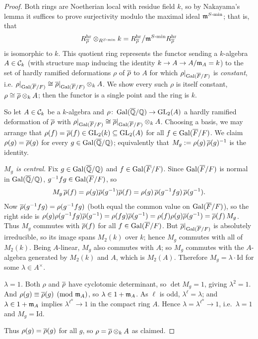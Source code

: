 \documentclass[11pt]{article}
\begin{document}
\begin{proof}
Both rings are Noetherian local with residue field $k$, so by Nakayama's lemma
it suffices to prove surjectivity modulo the maximal ideal
$\mathfrak{m}^{S\text{-}\mathrm{min}}$; that is, that
\[
  R^{\mathrm{hr}}_{\overline{\rho}}\otimes_{R^{S\text{-}\mathrm{min}}}k
    = R^{\mathrm{hr}}_{\overline{\rho}}\big/\mathfrak{m}^{S\text{-}\mathrm{min}}R^{\mathrm{hr}}_{\overline{\rho}}
\]
is isomorphic to $k$. This quotient ring represents the functor sending a
$k$-algebra $A\in\mathcal{C}_k$ (with structure map inducing the identity
$k\to A\to A/\mathfrak{m}_A=k$) to the set of hardly ramified deformations $\rho$ of
$\overline{\rho}$ to $A$ for which $\rho|_{\operatorname{Gal}(\overline{F}/F)}$ is \emph{constant}, i.e.
$\rho|_{\operatorname{Gal}(\overline{F}/F)}\cong\overline{\rho}|_{\operatorname{Gal}(\overline{F}/F)}\otimes_k A$. We show every such $\rho$ is itself
constant, $\rho\cong\overline{\rho}\otimes_k A$; then the functor is a single point and
the ring is $k$.

So let $A\in\mathcal{C}_k$ be a $k$-algebra and $\rho\colon\operatorname{Gal}(\overline{\mathbb{Q}}/\mathbb{Q})\to\operatorname{GL}_2(A)$ a hardly
ramified deformation of $\overline{\rho}$ with $\rho|_{\operatorname{Gal}(\overline{F}/F)}\cong\overline{\rho}|_{\operatorname{Gal}(\overline{F}/F)}\otimes_kA$.
Choosing a basis, we may arrange that
$\rho(f)=\overline{\rho}(f)\in\operatorname{GL}_2(k)\subseteq\operatorname{GL}_2(A)$ for all $f\in\operatorname{Gal}(\overline{F}/F)$. We claim
$\rho(g)=\overline{\rho}(g)$ for every $g\in\operatorname{Gal}(\overline{\mathbb{Q}}/\mathbb{Q})$; equivalently that
$M_g:=\rho(g)\,\overline{\rho}(g)^{-1}$ is the identity.

\emph{$M_g$ is central.} Fix $g\in\operatorname{Gal}(\overline{\mathbb{Q}}/\mathbb{Q})$ and $f\in\operatorname{Gal}(\overline{F}/F)$. Since $\operatorname{Gal}(\overline{F}/F)$ is normal in
$\operatorname{Gal}(\overline{\mathbb{Q}}/\mathbb{Q})$, $g^{-1}fg\in\operatorname{Gal}(\overline{F}/F)$, so
\[
  M_g\,\overline{\rho}(f)
  =\rho(g)\overline{\rho}(g^{-1})\overline{\rho}(f)
  =\rho(g)\,\overline{\rho}(g^{-1}fg)\,\overline{\rho}(g^{-1}).
\]
Now $\overline{\rho}(g^{-1}fg)=\rho(g^{-1}fg)$ (both equal the common value on $\operatorname{Gal}(\overline{F}/F)$),
so the right side is
$\rho(g)\rho(g^{-1}fg)\overline{\rho}(g^{-1})=\rho(fg)\overline{\rho}(g^{-1})
=\rho(f)\rho(g)\overline{\rho}(g^{-1})=\overline{\rho}(f)\,M_g$.
Thus $M_g$ commutes with $\overline{\rho}(f)$ for all $f\in\operatorname{Gal}(\overline{F}/F)$. But $\overline{\rho}|_{\operatorname{Gal}(\overline{F}/F)}$ is
absolutely irreducible, so its image spans $M_2(k)$ over $k$; hence $M_g$
commutes with all of $M_2(k)$. Being $A$-linear, $M_g$ also commutes with $A$;
so $M_g$ commutes with the $A$-algebra generated by $M_2(k)$ and $A$, which is
$M_2(A)$. Therefore $M_g=\lambda\cdot\mathrm{Id}$ for some $\lambda\in A^\times$.

\emph{$\lambda=1$.} Both $\rho$ and $\overline{\rho}$ have cyclotomic determinant, so
$\det M_g=1$, giving $\lambda^2=1$. And $\rho(g)\equiv\overline{\rho}(g)\pmod{\mathfrak{m}_A}$, so
$\lambda\in1+\mathfrak{m}_A$. As $\ell$ is odd, $\lambda^\ell=\lambda$; and $\lambda\in
1+\mathfrak{m}_A$ implies $\lambda^{\ell^n}\to1$ in the compact ring $A$. Hence
$\lambda=\lambda^{\ell^n}\to1$, i.e.\ $\lambda=1$ and $M_g=\mathrm{Id}$.

Thus $\rho(g)=\overline{\rho}(g)$ for all $g$, so $\rho=\overline{\rho}\otimes_kA$ as claimed.
\end{proof}
\end{document}
